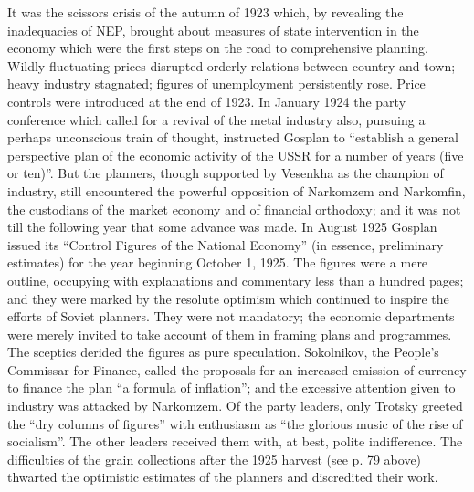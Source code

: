 It was the scissors crisis of the autumn of 1923 which, by revealing the inadequacies of NEP, brought about measures of state intervention in the economy which were the first steps on the road to comprehensive planning. Wildly fluctuating prices disrupted orderly relations between country and town; heavy industry stagnated; figures of unemployment persistently rose. Price controls were introduced at the end of 1923. In January 1924 the party conference which called for a revival of the metal industry also, pursuing a perhaps unconscious train of thought, instructed Gosplan to ``establish a general perspective plan of the economic activity of the USSR for a number of years (five or ten)''. But the planners, though supported by Vesenkha as the champion of industry, still encountered the powerful opposition of Narkomzem and Narkomfin, the custodians of the market economy and of financial orthodoxy; and it was not till the following year that some advance was made. In August 1925 Gosplan issued its ``Control Figures of the National Economy'' (in essence, preliminary estimates) for the year beginning October 1, 1925. The figures were a mere outline, occupying with explanations and commentary less than a hundred pages; and they were marked by the resolute optimism which continued to inspire the efforts of Soviet planners. They were not mandatory; the economic departments were merely invited to take account of them in framing plans and programmes. The sceptics derided the figures as pure speculation. Sokolnikov, the People's Commissar for Finance, called the proposals for an increased emission of currency to finance the plan ``a formula of inflation''; and the excessive attention given to industry was attacked by Narkomzem. Of the party leaders, only Trotsky greeted the ``dry columns of figures'' with enthusiasm as ``the glorious music of the rise of socialism''. The other leaders received them with, at best, polite indifference. The difficulties of the grain collections after the 1925 harvest (see p. 79 above) thwarted the optimistic estimates of the planners and discredited their work. 

